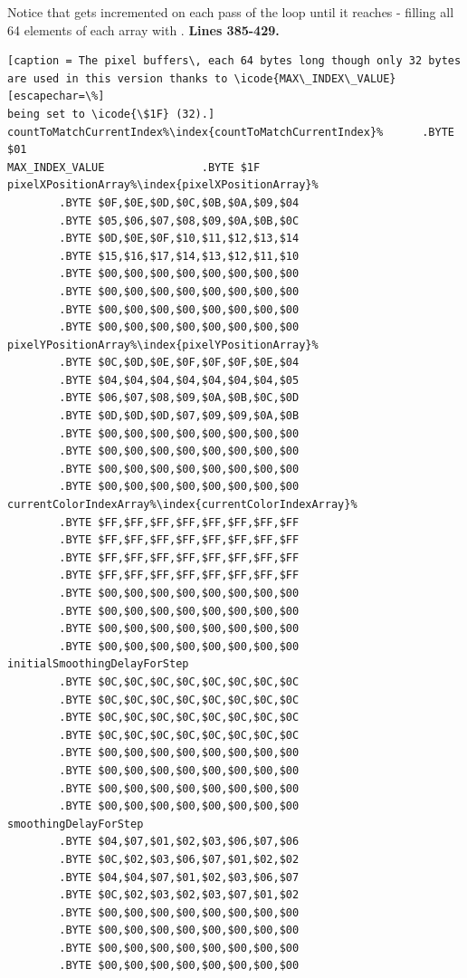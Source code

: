 Notice that  gets incremented on each pass of the loop until it reaches  - filling all 64 elements of each array with
.
\clearpage
\textbf{Lines 385-429. }
\begin{lstlisting}[escapechar=\%][caption = The pixel buffers\, each 64 bytes long though only 32 bytes are used in this version thanks to \icode{MAX\_INDEX\_VALUE}[escapechar=\%]
being set to \icode{\$1F} (32).]
countToMatchCurrentIndex%\index{countToMatchCurrentIndex}%      .BYTE $01
MAX_INDEX_VALUE               .BYTE $1F
pixelXPositionArray%\index{pixelXPositionArray}%   
        .BYTE $0F,$0E,$0D,$0C,$0B,$0A,$09,$04
        .BYTE $05,$06,$07,$08,$09,$0A,$0B,$0C
        .BYTE $0D,$0E,$0F,$10,$11,$12,$13,$14
        .BYTE $15,$16,$17,$14,$13,$12,$11,$10
        .BYTE $00,$00,$00,$00,$00,$00,$00,$00
        .BYTE $00,$00,$00,$00,$00,$00,$00,$00
        .BYTE $00,$00,$00,$00,$00,$00,$00,$00
        .BYTE $00,$00,$00,$00,$00,$00,$00,$00
pixelYPositionArray%\index{pixelYPositionArray}%   
        .BYTE $0C,$0D,$0E,$0F,$0F,$0F,$0E,$04
        .BYTE $04,$04,$04,$04,$04,$04,$04,$05
        .BYTE $06,$07,$08,$09,$0A,$0B,$0C,$0D
        .BYTE $0D,$0D,$0D,$07,$09,$09,$0A,$0B
        .BYTE $00,$00,$00,$00,$00,$00,$00,$00
        .BYTE $00,$00,$00,$00,$00,$00,$00,$00
        .BYTE $00,$00,$00,$00,$00,$00,$00,$00
        .BYTE $00,$00,$00,$00,$00,$00,$00,$00
currentColorIndexArray%\index{currentColorIndexArray}%   
        .BYTE $FF,$FF,$FF,$FF,$FF,$FF,$FF,$FF
        .BYTE $FF,$FF,$FF,$FF,$FF,$FF,$FF,$FF
        .BYTE $FF,$FF,$FF,$FF,$FF,$FF,$FF,$FF
        .BYTE $FF,$FF,$FF,$FF,$FF,$FF,$FF,$FF
        .BYTE $00,$00,$00,$00,$00,$00,$00,$00
        .BYTE $00,$00,$00,$00,$00,$00,$00,$00
        .BYTE $00,$00,$00,$00,$00,$00,$00,$00
        .BYTE $00,$00,$00,$00,$00,$00,$00,$00
initialSmoothingDelayForStep   
        .BYTE $0C,$0C,$0C,$0C,$0C,$0C,$0C,$0C
        .BYTE $0C,$0C,$0C,$0C,$0C,$0C,$0C,$0C
        .BYTE $0C,$0C,$0C,$0C,$0C,$0C,$0C,$0C
        .BYTE $0C,$0C,$0C,$0C,$0C,$0C,$0C,$0C
        .BYTE $00,$00,$00,$00,$00,$00,$00,$00
        .BYTE $00,$00,$00,$00,$00,$00,$00,$00
        .BYTE $00,$00,$00,$00,$00,$00,$00,$00
        .BYTE $00,$00,$00,$00,$00,$00,$00,$00
smoothingDelayForStep   
        .BYTE $04,$07,$01,$02,$03,$06,$07,$06
        .BYTE $0C,$02,$03,$06,$07,$01,$02,$02
        .BYTE $04,$04,$07,$01,$02,$03,$06,$07
        .BYTE $0C,$02,$03,$02,$03,$07,$01,$02
        .BYTE $00,$00,$00,$00,$00,$00,$00,$00
        .BYTE $00,$00,$00,$00,$00,$00,$00,$00
        .BYTE $00,$00,$00,$00,$00,$00,$00,$00
        .BYTE $00,$00,$00,$00,$00,$00,$00,$00


\end{lstlisting}
\clearpage


